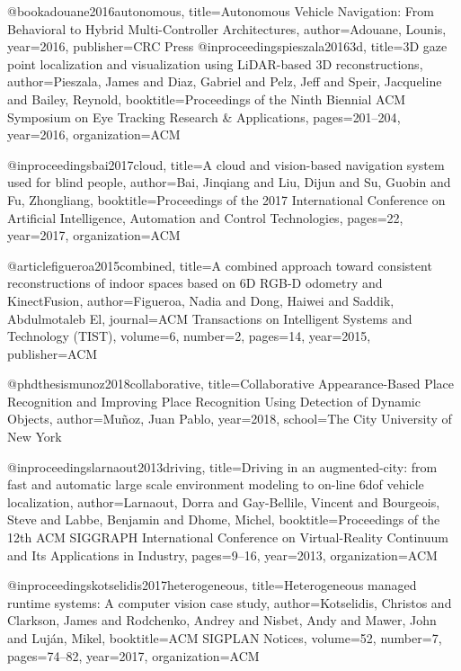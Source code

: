 @book{adouane2016autonomous,
  title={Autonomous Vehicle Navigation: From Behavioral to Hybrid Multi-Controller Architectures},
  author={Adouane, Lounis},
  year={2016},
  publisher={CRC Press}
}
@inproceedings{pieszala20163d,
  title={3D gaze point localization and visualization using LiDAR-based 3D reconstructions},
  author={Pieszala, James and Diaz, Gabriel and Pelz, Jeff and Speir, Jacqueline and Bailey, Reynold},
  booktitle={Proceedings of the Ninth Biennial ACM Symposium on Eye Tracking Research \& Applications},
  pages={201--204},
  year={2016},
  organization={ACM}
}

@inproceedings{bai2017cloud,
  title={A cloud and vision-based navigation system used for blind people},
  author={Bai, Jinqiang and Liu, Dijun and Su, Guobin and Fu, Zhongliang},
  booktitle={Proceedings of the 2017 International Conference on Artificial Intelligence, Automation and Control Technologies},
  pages={22},
  year={2017},
  organization={ACM}
}

@article{figueroa2015combined,
  title={A combined approach toward consistent reconstructions of indoor spaces based on 6D RGB-D odometry and KinectFusion},
  author={Figueroa, Nadia and Dong, Haiwei and Saddik, Abdulmotaleb El},
  journal={ACM Transactions on Intelligent Systems and Technology (TIST)},
  volume={6},
  number={2},
  pages={14},
  year={2015},
  publisher={ACM}
}

@phdthesis{munoz2018collaborative,
  title={Collaborative Appearance-Based Place Recognition and Improving Place Recognition Using Detection of Dynamic Objects},
  author={Mu{\~n}oz, Juan Pablo},
  year={2018},
  school={The City University of New York}
}

@inproceedings{larnaout2013driving,
  title={Driving in an augmented-city: from fast and automatic large scale environment modeling to on-line 6dof vehicle localization},
  author={Larnaout, Dorra and Gay-Bellile, Vincent and Bourgeois, Steve and Labbe, Benjamin and Dhome, Michel},
  booktitle={Proceedings of the 12th ACM SIGGRAPH International Conference on Virtual-Reality Continuum and Its Applications in Industry},
  pages={9--16},
  year={2013},
  organization={ACM}
}

@inproceedings{kotselidis2017heterogeneous,
  title={Heterogeneous managed runtime systems: A computer vision case study},
  author={Kotselidis, Christos and Clarkson, James and Rodchenko, Andrey and Nisbet, Andy and Mawer, John and Luj{\'a}n, Mikel},
  booktitle={ACM SIGPLAN Notices},
  volume={52},
  number={7},
  pages={74--82},
  year={2017},
  organization={ACM}
}

